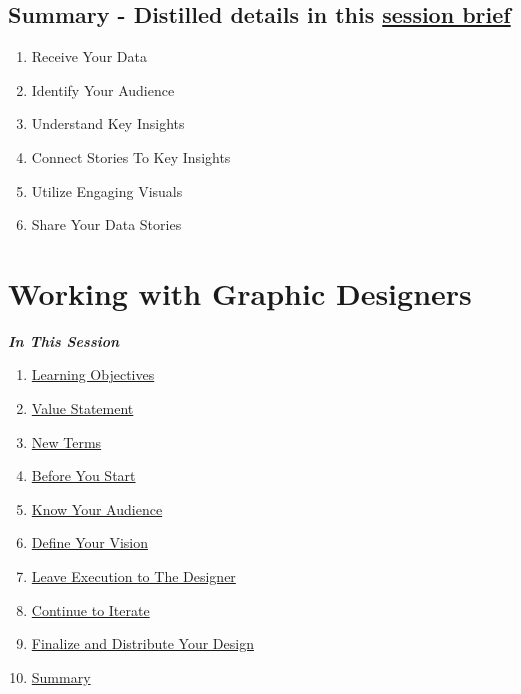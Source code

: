 \documentclass[
]{book}
\providecommand{\tightlist}{%
  \setlength{\itemsep}{0pt}\setlength{\parskip}{0pt}}
\begin{document}
\hypertarget{summary---distilled-details-in-this-session-brief}{%
\subsection{\texorpdfstring{Summary - Distilled details in this \href{PDF-Files/M4-S2.Data-Storytelling.Brief.pdf}{session brief}}{Summary - Distilled details in this session brief}}\label{summary---distilled-details-in-this-session-brief}}

\begin{enumerate}
\def\labelenumi{\arabic{enumi}.}
\tightlist
\item
  Receive Your Data
\item
  Identify Your Audience
\item
  Understand Key Insights
\item
  Connect Stories To Key Insights
\item
  Utilize Engaging Visuals
\item
  Share Your Data Stories
\end{enumerate}

\hypertarget{working-with-graphic-designers}{%
\section{Working with Graphic Designers}\label{working-with-graphic-designers}}

\textbf{\emph{In This Session }}

\begin{enumerate}
\def\labelenumi{\arabic{enumi}.}
\tightlist
\item
  \protect\hyperlink{graphic-design-learning-objectives}{Learning Objectives}
\item
  \protect\hyperlink{graphic-design-value-statement}{Value Statement}
\item
  \protect\hyperlink{new-terms}{New Terms}
\item
  \protect\hyperlink{before-you-start}{Before You Start}
\item
  \protect\hyperlink{know-your-audience}{Know Your Audience}
\item
  \protect\hyperlink{define-your-vision}{Define Your Vision}
\item
  \protect\hyperlink{leave-execution-to-the-designer}{Leave Execution to The Designer}
\item
  \protect\hyperlink{continue-to-iterate}{Continue to Iterate}
\item
  \protect\hyperlink{finalize-and-distribute-your-design}{Finalize and Distribute Your Design}
\item
  \protect\hyperlink{summary}{Summary}
\end{enumerate}
\end{document}
